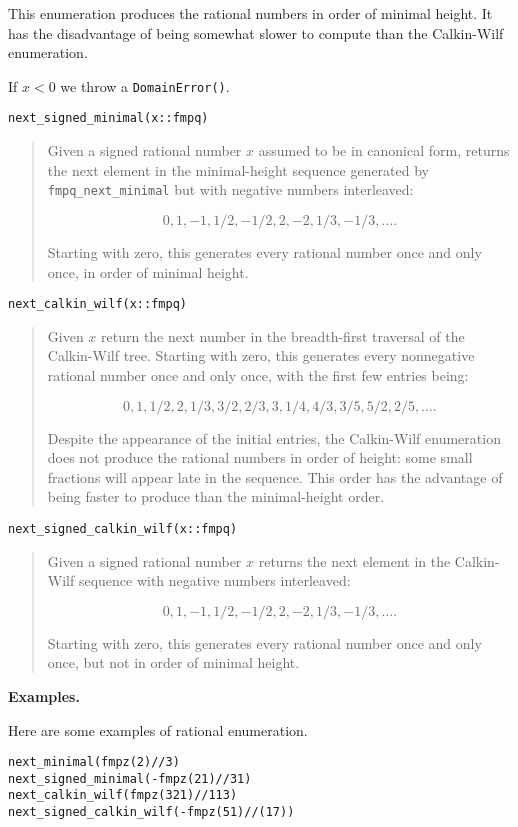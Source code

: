 \documentclass[a4paper,10pt]{article}
\newcommand{\code}{\lstinline}
\newcommand{\desc}[1]{\vspace{-3mm}\begin{quote}#1\end{quote}}
\begin{document}
{{{This enumeration produces the rational numbers in order of minimal height. 
It has the disadvantage of being somewhat slower to compute than the
Calkin-Wilf enumeration.

If $x < 0$ we throw a \code{DomainError()}.}

\begin{lstlisting}
next_signed_minimal(x::fmpq)
\end{lstlisting}

\desc{Given a signed rational number $x$ assumed to be in canonical form, 
returns the next element in the minimal-height sequence generated by 
\code{fmpq_next_minimal} but with negative numbers interleaved:

$$0, 1, -1, 1/2, -1/2, 2, -2, 1/3, -1/3, \ldots.$$

Starting with zero, this generates every rational number once and only once,
in order of minimal height.}

\begin{lstlisting}
next_calkin_wilf(x::fmpq)
\end{lstlisting}

\desc{Given $x$ return the next number in the breadth-first traversal of the
Calkin-Wilf tree. Starting with zero, this generates every nonnegative
rational number once and only once, with the first few entries being:

$$0, 1, 1/2, 2, 1/3, 3/2, 2/3, 3, 1/4, 4/3, 3/5, 5/2, 2/5, \ldots.$$

Despite the appearance of the initial entries, the Calkin-Wilf enumeration 
does not produce the rational numbers in order of height: some small fractions
will appear late in the sequence. This order has the advantage of being faster 
to produce than the minimal-height order.}

\begin{lstlisting}
next_signed_calkin_wilf(x::fmpq)
\end{lstlisting}

\desc{Given a signed rational number $x$ returns the next element in the
Calkin-Wilf sequence with negative numbers interleaved:

$$0, 1, -1, 1/2, -1/2, 2, -2, 1/3, -1/3, \ldots.$$

Starting with zero, this generates every rational number once and only once,
but not in order of minimal height.}

\textbf{Examples.}

Here are some examples of rational enumeration.

\begin{lstlisting}
next_minimal(fmpz(2)//3)
next_signed_minimal(-fmpz(21)//31)
next_calkin_wilf(fmpz(321)//113)
next_signed_calkin_wilf(-fmpz(51)//(17))
\end{lstlisting}

}}
\end{document}
